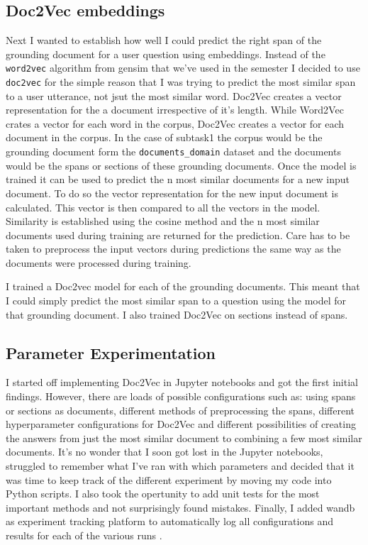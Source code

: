 \documentclass[11pt]{article}
\begin{document}
    \subsection{Doc2Vec embeddings}\label{subsec:doc2vc-method}
    Next I wanted to establish how well I could predict the right span of the grounding document for a user question using
    embeddings. Instead of the \texttt{word2vec} algorithm from gensim that we've used in the semester I decided to use
    \texttt{doc2vec} \cite{doc2vec} for the simple reason that I was trying to predict the most similar span to a user utterance, not jsut
    the most similar word. Doc2Vec creates a vector representation for the a document irrespective of it's length.
    While Word2Vec crates a vector for each word in the corpus, Doc2Vec creates a vector for each document in the corpus.
    In the case of subtask1 the corpus would be the grounding document form the \texttt{documents\_domain} dataset
    and the documents would be the spans or sections of these grounding documents. Once the model is trained
    it can be used to predict the n most similar documents for a new input document. To do so the vector representation
    for the new input document is calculated. This vector is then compared to all the vectors in the model. Similarity
    is established using the cosine method and the n most similar documents used during training are returned for the prediction.
    Care has to be taken to preprocess the input vectors during predictions
    the same way as the documents were processed during training.

    I trained a Doc2vec model for each of the grounding documents. This meant that I could simply predict
    the most similar span to a question using the model for that grounding document. I also trained Doc2Vec on sections instead
    of spans.

    \subsection{Parameter Experimentation}\label{subsec:experimentation-method}
    I started off implementing Doc2Vec in Jupyter notebooks and got the first initial findings. However, there are loads
    of possible configurations such as: using spans or sections as documents, different methods of preprocessing the spans, different
    hyperparameter configurations for Doc2Vec and different possibilities of creating the answers from just the most similar
    document to combining a few most similar documents. It's no wonder that I soon got lost in the Jupyter notebooks, struggled
    to remember what I've ran with which parameters and
    decided that it was time to keep track of the different experiment by moving my code into Python scripts. I also took
    the opertunity to add unit tests for the most important methods and not surprisingly found mistakes.
    Finally, I added wandb as experiment tracking platform to automatically log all configurations and results for each of
    the various runs \cite{wandb}.
\end{document}
